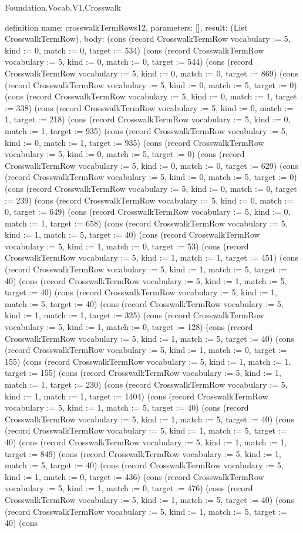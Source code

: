 \begin{lexlean}{Foundation.Vocab.V1.Crosswalk}
\begin{semanticmodule}
definition{
  name: crosswalkTermRows12,
  parameters: [],
  result: (List CrosswalkTermRow),
  body: (cons (record CrosswalkTermRow {vocabulary := 5, kind := 0, match := 0, target := 534}) (cons (record CrosswalkTermRow {vocabulary := 5, kind := 0, match := 0, target := 544}) (cons (record CrosswalkTermRow {vocabulary := 5, kind := 0, match := 0, target := 869}) (cons (record CrosswalkTermRow {vocabulary := 5, kind := 0, match := 5, target := 0}) (cons (record CrosswalkTermRow {vocabulary := 5, kind := 0, match := 1, target := 338}) (cons (record CrosswalkTermRow {vocabulary := 5, kind := 0, match := 1, target := 218}) (cons (record CrosswalkTermRow {vocabulary := 5, kind := 0, match := 1, target := 935}) (cons (record CrosswalkTermRow {vocabulary := 5, kind := 0, match := 1, target := 935}) (cons (record CrosswalkTermRow {vocabulary := 5, kind := 0, match := 5, target := 0}) (cons (record CrosswalkTermRow {vocabulary := 5, kind := 0, match := 0, target := 629}) (cons (record CrosswalkTermRow {vocabulary := 5, kind := 0, match := 5, target := 0}) (cons (record CrosswalkTermRow {vocabulary := 5, kind := 0, match := 0, target := 239}) (cons (record CrosswalkTermRow {vocabulary := 5, kind := 0, match := 0, target := 649}) (cons (record CrosswalkTermRow {vocabulary := 5, kind := 0, match := 1, target := 658}) (cons (record CrosswalkTermRow {vocabulary := 5, kind := 1, match := 5, target := 40}) (cons (record CrosswalkTermRow {vocabulary := 5, kind := 1, match := 0, target := 53}) (cons (record CrosswalkTermRow {vocabulary := 5, kind := 1, match := 1, target := 451}) (cons (record CrosswalkTermRow {vocabulary := 5, kind := 1, match := 5, target := 40}) (cons (record CrosswalkTermRow {vocabulary := 5, kind := 1, match := 5, target := 40}) (cons (record CrosswalkTermRow {vocabulary := 5, kind := 1, match := 5, target := 40}) (cons (record CrosswalkTermRow {vocabulary := 5, kind := 1, match := 1, target := 325}) (cons (record CrosswalkTermRow {vocabulary := 5, kind := 1, match := 0, target := 128}) (cons (record CrosswalkTermRow {vocabulary := 5, kind := 1, match := 5, target := 40}) (cons (record CrosswalkTermRow {vocabulary := 5, kind := 1, match := 0, target := 155}) (cons (record CrosswalkTermRow {vocabulary := 5, kind := 1, match := 1, target := 155}) (cons (record CrosswalkTermRow {vocabulary := 5, kind := 1, match := 1, target := 230}) (cons (record CrosswalkTermRow {vocabulary := 5, kind := 1, match := 1, target := 1404}) (cons (record CrosswalkTermRow {vocabulary := 5, kind := 1, match := 5, target := 40}) (cons (record CrosswalkTermRow {vocabulary := 5, kind := 1, match := 5, target := 40}) (cons (record CrosswalkTermRow {vocabulary := 5, kind := 1, match := 5, target := 40}) (cons (record CrosswalkTermRow {vocabulary := 5, kind := 1, match := 1, target := 849}) (cons (record CrosswalkTermRow {vocabulary := 5, kind := 1, match := 5, target := 40}) (cons (record CrosswalkTermRow {vocabulary := 5, kind := 1, match := 0, target := 436}) (cons (record CrosswalkTermRow {vocabulary := 5, kind := 1, match := 0, target := 476}) (cons (record CrosswalkTermRow {vocabulary := 5, kind := 1, match := 5, target := 40}) (cons (record CrosswalkTermRow {vocabulary := 5, kind := 1, match := 5, target := 40}) (cons }
\end{semanticmodule}
\end{lexlean}

